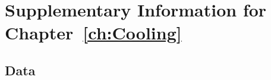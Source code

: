 \chapter{Supplementary Information for Chapter~\ref{ch:Cooling}}
\label{appendix: Cooling}
\acresetall

\section{Data}
